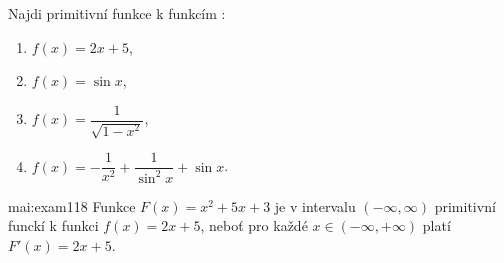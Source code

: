 \documentclass{scrbook}
\begin{document}
  \shorthandoff{-}
  
  \frontmatter
    
    \tableofcontents
  \mainmatter 
    \setcounter{page}{3} 

    \begin{mathexam}{Najdi primitivní funkce k funkcím \cite[s.~254]{Brabec1989}:
      \begin{enumerate}
        \item \(f(x) = 2x+5\),
        \item \(f(x) = \sin x\),
        \item \(f(x) = \dfrac{1}{\sqrt{1-x^2}}\),
        \item \(f(x) = -\dfrac{1}{x^2} + \dfrac{1}{\sin^2x} + \sin x\).
      \end{enumerate}
    }{mai:exam118} 
    Funkce \(F(x) = x^2+5x+3\) je v intervalu \((-\infty, \infty)\) primitivní funckí
    k funkci \(f(x) = 2x+5\), neboť pro každé \(x\in(-\infty,+\infty)\) platí \(F'(x)=2x+5\).
    \end{mathexam}
  \backmatter
\end{document}
